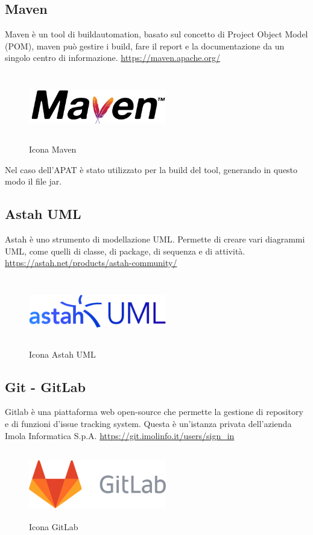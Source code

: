 \subsection*{Maven}
Maven è un tool di \gls{buildautomation}, basato sul concetto di Project Object Model (POM), maven può gestire i build, fare il report e la documentazione da un singolo centro di informazione.
\url{https://maven.apache.org/}
\begin{figure}[H]
    \centering
    \includegraphics[width=6cm, height=3cm]{./immagini/maven.png}
    \caption{Icona Maven}\label{fig:maven}
\end{figure}
Nel caso dell'APAT è stato utilizzato per la build del tool, generando in questo modo il file jar.

\subsection*{Astah UML}
Astah è uno strumento di modellazione UML. Permette di creare vari diagrammi UML, come quelli di classe, di package, di sequenza e di attività.
\url{https://astah.net/products/astah-community/}
\begin{figure}[H]
    \centering
    \includegraphics[width=6cm, height=3cm]{./immagini/astah.png}
    \caption{Icona Astah UML}\label{fig:astah}
\end{figure}

\subsection*{Git - GitLab}
Gitlab è una piattaforma web open-source che permette la gestione di repository e di funzioni d'issue tracking system.
Questa è un'istanza privata dell'azienda Imola Informatica S.p.A.
\url{https://git.imolinfo.it/users/sign_in}
\begin{figure}[H]
    \centering
    \includegraphics[width=6cm, height=3cm]{./immagini/gitlab.png}
    \caption{Icona GitLab}\label{fig:gitlab}
\end{figure}
